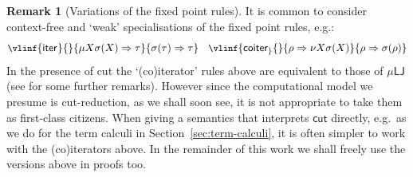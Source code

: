 \documentclass[10pt,a4paper]{amsart}
\theoremstyle{plain}
\theoremstyle{definition}
\newtheorem{remark}[remark]{Remark}
\theoremstyle{plain}
\theoremstyle{definition} %
\newcommand{\seqar}{\Rightarrow}
\newcommand{\iter}[1]{\mathsf{iter}_{#1}}
\newcommand{\coiter}[1]{\mathsf{coiter}_{#1}}
\newcommand{\cut}{\mathsf{cut}}
\newcommand{\LJ}{\mathsf{LJ}}
\newcommand{\muLJ}{\mu\LJ}
\begin{document}
\begin{remark}
    [Variations of the fixed point rules]
    \label{rem:iter-variations}
    It is common to consider context-free and `weak' specialisations of the fixed point rules, e.g.:
    \begin{equation}
    \small
        \label{eq:(co)iterators-as-rules}
            \vlinf{\iter{}}{}{\mu X \sigma(X)\seqar \tau}{\sigma(\tau)\seqar \tau}
    \quad
    \vlinf{\coiter}{}{\rho\seqar \nu X \sigma(X)}{\rho\seqar \sigma(\rho)}
    \end{equation}
    In the presence of cut the `(co)iterator' rules above are equivalent to those of $\muLJ$ (see  for some further remarks).
    However since the computational model we presume is cut-reduction, as we shall soon see, it is not appropriate to take them as first-class citizens.
    When giving a semantics that interprets $\cut$ directly, e.g.\ as we do for the term calculi in Section~\ref{sec:term-calculi}, it is often simpler to work with the (co)iterators above.
% 
    In the remainder of this work
    we shall freely use the versions above in proofs too.
\end{remark}
\end{document}
